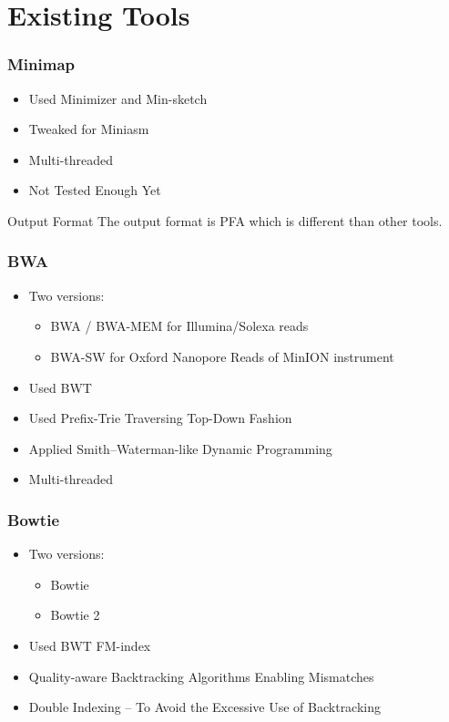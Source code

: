 \section{Existing Tools}

\begin{frame}
	\frametitle{Minimap}
	\begin{itemize}
		\item<1-> Used Minimizer and Min-sketch
		\item<1-> Tweaked for Miniasm
		\item<1-> Multi-threaded
		\item<1-> Not Tested Enough Yet
	\end{itemize}
	\begin{alertblock}{Output Format}
		The output format is PFA which is different than other tools.
	\end{alertblock}
\end{frame}

\begin{frame}
	\frametitle{BWA}
	\begin{itemize}
		\item<1-> Two versions:
			\begin{itemize}
				\item<1-> BWA / BWA-MEM for Illumina/Solexa reads
				\item<1-> BWA-SW for Oxford Nanopore Reads of MinION instrument
			\end{itemize}			
		\item<1-> Used BWT
		\item<1-> Used Prefix-Trie Traversing Top-Down Fashion
		\item<1-> Applied Smith–Waterman-like Dynamic Programming
		\item<1-> Multi-threaded
	\end{itemize}
\end{frame}

\begin{frame}
	\frametitle{Bowtie}
	\begin{itemize}
		\item<1-> Two versions:
		\begin{itemize}
			\item<1-> Bowtie 
			\item<1-> Bowtie 2
		\end{itemize}			
		\item<1-> Used BWT FM-index
		\item<1-> Quality-aware Backtracking Algorithms Enabling Mismatches
		\item<1-> Double Indexing  -- To Avoid the Excessive Use of Backtracking
	\end{itemize}
\end{frame}

